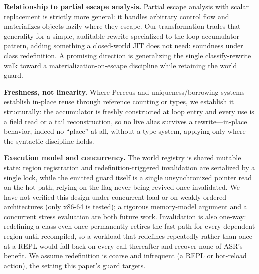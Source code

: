 \documentclass[sigplan,screen,review,anonymous]{acmart}
\begin{document}
\textbf{Relationship to partial escape analysis.} Partial escape analysis
with scalar replacement \cite{stadler2014partial} is strictly more
general: it handles arbitrary control flow and materializes objects
lazily where they escape. Our transformation trades that
generality for a simple, auditable rewrite specialized to the
loop-accumulator pattern, adding something a closed-world JIT does not
need: soundness under class redefinition. A promising direction is
generalizing the single classify-rewrite walk toward a
materialization-on-escape discipline while retaining the world guard.

\textbf{Freshness, not linearity.} Where Perceus \cite{reinking2021perceus}
and uniqueness/borrowing systems \cite{lorenzen2023functional} establish
in-place reuse through reference counting or types, we establish it
structurally: the accumulator is freshly constructed at loop entry and
every use is a field read or a tail reconstruction, so no live alias
survives a rewrite---in-place behavior, indeed no ``place'' at all,
without a type system, applying only where the syntactic
discipline holds.

\textbf{Execution model and concurrency.} The world registry is shared
mutable state: region registration and redefinition-triggered
invalidation are serialized by a single lock, while the emitted guard
itself is a single unsynchronized pointer read on the hot path, relying
on the flag never being revived once invalidated. We have not verified
this design under concurrent load or on weakly-ordered architectures
(only x86-64 is tested); a rigorous memory-model argument and a
concurrent stress evaluation are both future work. Invalidation is also
one-way: redefining a class even once permanently retires the fast path
for every dependent region until recompiled, so a workload that
redefines repeatedly rather than once at a REPL would fall back on every
call thereafter and recover none of ASR's benefit. We assume redefinition
is coarse and infrequent (a REPL or hot-reload action), the setting this
paper's guard targets.
\end{document}
